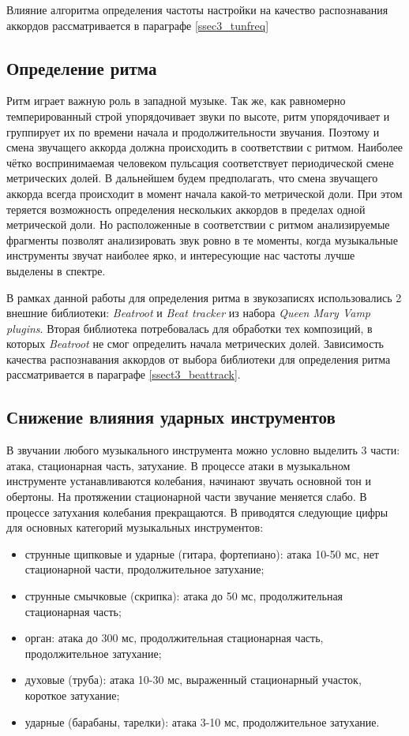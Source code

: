 Влияние алгоритма определения частоты настройки на качество распознавания
аккордов рассматривается в параграфе \ref{ssec3_tunfreq}

\subsection{Определение ритма} \label{ssect1_rhyhtm}

Ритм играет важную роль в западной музыке. Так же, как равномерно
темперированный строй упорядочивает звуки по высоте, ритм упорядочивает и
группирует их по времени начала и продолжительности звучания. Поэтому и смена
звучащего аккорда должна происходить в соответствии с ритмом. Наиболее чётко
воспринимаемая человеком пульсация соответствует периодической смене метрических
долей. В дальнейшем будем предполагать, что смена звучащего аккорда всегда
происходит в момент начала какой-то метрической доли. При этом теряется
возможность определения нескольких аккордов в пределах одной метрической доли.
Но расположенные в соответствии с ритмом анализируемые фрагменты позволят
анализировать звук ровно в те моменты, когда музыкальные инструменты звучат
наиболее ярко, и интересующие нас частоты лучше выделены в спектре.

В рамках данной работы для определения ритма в звукозаписях использовались 2
внешние библиотеки: \emph{Beatroot} \cite{Dixon2007} и \emph{Beat tracker}
\cite{Davies2007} из набора \emph{Queen Mary Vamp plugins}. Вторая библиотека
потребовалась для обработки тех композиций, в которых \emph{Beatroot} не
смог определить начала метрических долей. Зависимость качества распознавания
аккордов от выбора библиотеки для определения ритма рассматривается в параграфе
\ref{ssect3_beattrack}.

\subsection{Снижение влияния ударных инструментов}

В звучании любого музыкального инструмента можно условно выделить 3 части:
атака, стационарная часть, затухание. В процессе атаки в музыкальном
инструменте устанавливаются колебания, начинают звучать основной тон и
обертоны. На протяжении стационарной части звучание меняется слабо. В процессе
затухания колебания прекращаются. В \cite{Aldoshina2006} приводятся следующие
цифры для основных категорий музыкальных инструментов:
\begin{itemize}
  \item струнные щипковые и ударные (гитара, фортепиано): атака 10-50 мс, нет
  стационарной части, продолжительное затухание;
  \item струнные смычковые (скрипка): атака до 50 мс, продолжительная
  стационарная часть;
  \item орган: атака до 300 мс, продолжительная стационарная часть,
  продолжительное затухание;
  \item духовые (труба): атака 10-30 мс, выраженный стационарный участок,
  короткое затухание;
  \item ударные (барабаны, тарелки): атака 3-10 мс, продолжительное затухание.
\end{itemize}

